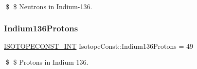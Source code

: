 \$ \$ Neutrons in Indium-\/136. \mbox{\label{group___isotope_const-_indium-_in136_gabed71ba144465bfb722ce0ed5a4123a3}} 
\subsubsection{\texorpdfstring{Indium136\+Protons}{Indium136Protons}}
{\footnotesize\ttfamily \mbox{\hyperlink{group___isotope_const-_macros_ga5f18360b3e99483a35c32d789e62621c}{I\+S\+O\+T\+O\+P\+E\+C\+O\+N\+S\+T\+\_\+\+I\+NT}} Isotope\+Const\+::\+Indium136\+Protons = 49}

\$ \$ Protons in Indium-\/136. 